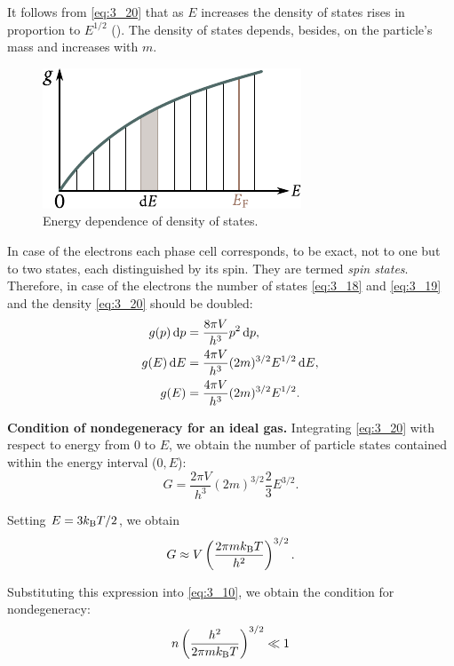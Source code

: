 It follows from \eqref{eq:3_20} that as $E$ increases the density of states rises in proportion to $E^{1/2}$ (). The density of states depends, besides, on the particle's mass and increases with $m$.

\begin{figure}[t]
	\begin{center}
		\includegraphics[scale=1]{figures/ch_03/fig_3_2.pdf}
		\caption[]{Energy dependence of density of states.}
		\label{fig:3_2}
	\end{center}
	\vspace{-0.7cm}
\end{figure}

In case of the electrons each phase cell corresponds, to be exact, not to one but to two states, each distinguished by its spin. They are termed \textit{spin states}. Therefore, in case of the electrons the number of states \eqref{eq:3_18} and \eqref{eq:3_19} and the density \eqref{eq:3_20} should be doubled:
\begin{align}
    g(p)\, \mathrm{d} p &= \frac{8\pi V}{h^3} p^2\,\mathrm{d} p,\label{eq:3_21}\\
    g(E)\, \mathrm{d} E &= \frac{4\pi V}{h^3} (2m)^{3/2} E^{1/2}\,\mathrm{d} E,\label{eq:3_22}\\
    g(E) &= \frac{4\pi V}{h^3} (2m)^{3/2} E^{1/2}.\label{eq:3_23}
\end{align}

\textbf{Condition of nondegeneracy for an ideal gas.} Integrating \eqref{eq:3_20} with respect to energy from $0$ to $E$, we obtain the number of particle states contained within the energy interval ($0, E$):
\begin{equation*}
    G = \frac{2\pi V}{h^3} (2m)^{3/2} \frac{2}{3} E^{3/2}.
\end{equation*}

\noindent
Setting $E=3k_{\text{B}}T/2$, we obtain
\begin{equation*}
    G \approx V \left(\frac{2\pi m k_{\text{B}} T}{h^2}\right)^{3/2}.
\end{equation*}

\noindent
Substituting this expression into \eqref{eq:3_10}, we obtain the condition for nondegeneracy:
\vspace{-12pt}
\begin{equation}\label{eq:3_24}
    n \left(\frac{h^2}{2\pi m k_{\text{B}} T}\right)^{3/2} \ll 1
\end{equation}

